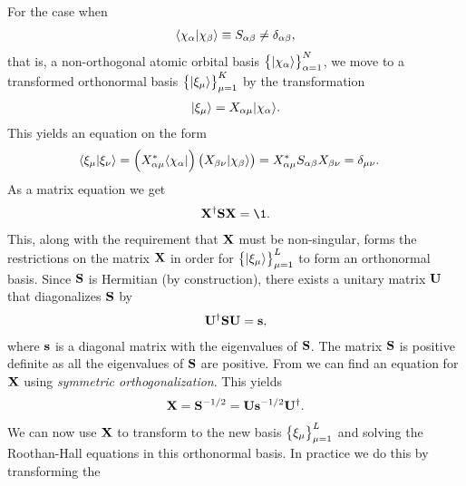         For the case when
        \begin{align}
            \langle \chi_{\alpha} | \chi_{\beta} \rangle \equiv S_{\alpha\beta}
            \neq \delta_{\alpha\beta},
        \end{align}
        that is, a non-orthogonal atomic orbital basis
        $\left\{ | \chi_{\alpha} \rangle \right\}_{\alpha = 1}^{N}$, we move to a transformed
        orthonormal basis $\left\{ | \xi_{\mu} \rangle \right\}_{\mu = 1}^{K}$ by the
        transformation
        \begin{align}
            | \xi_{\mu} \rangle = X_{\alpha\mu}| \chi_{\alpha} \rangle.
        \end{align}
        This yields an equation on the form
        \begin{align}
            \langle \xi_{\mu} | \xi_{\nu} \rangle
            &= \left( 
                X_{\alpha\mu}^{*}\langle \chi_{\alpha} |
             \right)\left( 
                X_{\beta\nu}| \chi_{\beta} \rangle
             \right)
            = X_{\alpha\mu}^{*}S_{\alpha\beta}X_{\beta\nu}
            = \delta_{\mu\nu}.
        \end{align}
        As a matrix equation we get
        \begin{align}
            \vf{X}^{\dagger}\vf{S}\vf{X} = \1.
            \label{eq:orthonormal-transformation}
        \end{align}
        This, along with the requirement that $\mathbf{X}$ must be non-singular,
        forms the restrictions on the matrix $\mathbf{X}$ in order for
        $\left\{ | \xi_{\mu} \rangle \right\}_{\mu = 1}^{L}$ to form an orthonormal basis.
        Since $\mathbf{S}$ is Hermitian (by construction), there exists a unitary
        matrix $\mathbf{U}$ that diagonalizes $\mathbf{S}$ by
        \begin{align}
            \mathbf{U}^{\dagger}\mathbf{S}\mathbf{U} = \mathbf{s},
        \end{align}
        where $\mathbf{s}$ is a diagonal matrix with the eigenvalues of $\mathbf{S}$.
        The matrix $\mathbf{S}$ is positive definite as all the eigenvalues of
        $\mathbf{S}$ are positive. From \citeauthor{mayer2002lowdin} we can find an
        equation for $\mathbf{X}$ using \emph{symmetric orthogonalization}. This
        yields
        \begin{align}
            \mathbf{X} = \mathbf{S}^{-1/2} = \mathbf{U}\mathbf{s}^{-1/2}\mathbf{U}^{\dagger}.
        \end{align}
        We can now use $\mathbf{X}$ to transform to the new basis
        $\left\{ \xi_{\mu} \right\}_{\mu = 1}^{L}$ and solving the Roothan-Hall equations
        in this orthonormal basis. In practice we do this by transforming the

